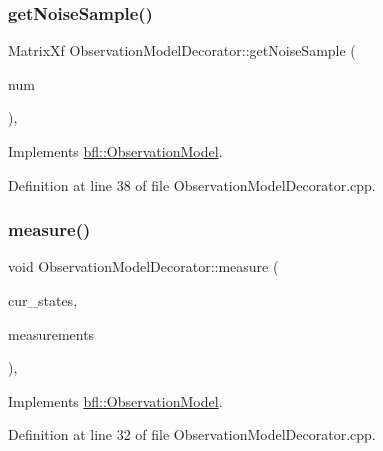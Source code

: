 \subsubsection{\texorpdfstring{get\+Noise\+Sample()}{getNoiseSample()}}
{\footnotesize\ttfamily Matrix\+Xf Observation\+Model\+Decorator\+::get\+Noise\+Sample (\begin{DoxyParamCaption}\item[{const int}]{num }\end{DoxyParamCaption})\hspace{0.3cm}{\ttfamily [override]}, {\ttfamily [virtual]}}



Implements \mbox{\hyperlink{classbfl_1_1ObservationModel_a45e8cec2a18ef49bf586c8895c13a31b}{bfl\+::\+Observation\+Model}}.



Definition at line 38 of file Observation\+Model\+Decorator.\+cpp.

\mbox{\label{classbfl_1_1ObservationModelDecorator_a6b0da9bcfe0fd1beb119c79f83f8cc9a}} 
\subsubsection{\texorpdfstring{measure()}{measure()}}
{\footnotesize\ttfamily void Observation\+Model\+Decorator\+::measure (\begin{DoxyParamCaption}\item[{const Eigen\+::\+Ref$<$ const Eigen\+::\+Matrix\+Xf $>$ \&}]{cur\+\_\+states,  }\item[{Eigen\+::\+Ref$<$ Eigen\+::\+Matrix\+Xf $>$}]{measurements }\end{DoxyParamCaption})\hspace{0.3cm}{\ttfamily [override]}, {\ttfamily [virtual]}}



Implements \mbox{\hyperlink{classbfl_1_1ObservationModel_a0cde643e52b6c24d80d1b49e1b58f4c0}{bfl\+::\+Observation\+Model}}.



Definition at line 32 of file Observation\+Model\+Decorator.\+cpp.

\mbox{\label{classbfl_1_1ObservationModelDecorator_aa2b83722ba591ab268def7a39e4e16b0}} 
